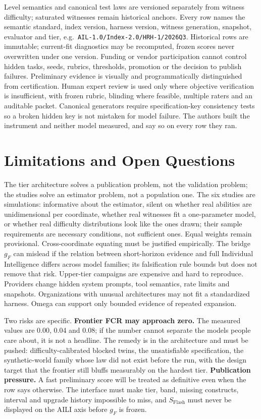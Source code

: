 \documentclass[11pt]{article}
\theoremstyle{definition}
\begin{document}
Level semantics and canonical test laws are versioned separately from witness difficulty; saturated witnesses remain historical anchors. Every row names the semantic standard, index version, harness version, witness generation, snapshot, evaluator and tier, e.g.\ \texttt{AIL-1.0/Index-2.0/HRH-1/2026Q3}. Historical rows are immutable; current-fit diagnostics may be recomputed, frozen scores never overwritten under one version. Funding or vendor participation cannot control hidden tasks, seeds, rubrics, thresholds, promotion or the decision to publish failures. Preliminary evidence is visually and programmatically distinguished from certification. Human expert review is used only where objective verification is insufficient, with frozen rubric, blinding where feasible, multiple raters and an auditable packet. Canonical generators require specification-key consistency tests so a broken hidden key is not mistaken for model failure. The authors built the instrument and neither model measured, and say so on every row they ran.

\section{Limitations and Open Questions}\label{sec:limits}

The tier architecture solves a publication problem, not the validation problem; the studies solve an estimator problem, not a population one. The six studies are simulations: informative about the estimator, silent on whether real abilities are unidimensional per coordinate, whether real witnesses fit a one-parameter model, or whether real difficulty distributions look like the ones drawn; their sample requirements are necessary conditions, not sufficient ones. Equal weights remain provisional. Cross-coordinate equating must be justified empirically. The bridge $g_F$ can mislead if the relation between short-horizon evidence and full Individual Intelligence differs across model families; its falsification rule bounds but does not remove that risk. Upper-tier campaigns are expensive and hard to reproduce. Providers change hidden system prompts, tool semantics, rate limits and snapshots. Organizations with unusual architectures may not fit a standardized harness. Omega can support only bounded evidence of repeated expansion.

Two risks are specific. \textbf{Frontier FCR may approach zero.} The measured values are 0.00, 0.04 and 0.08; if the number cannot separate the models people care about, it is not a headline. The remedy is in the architecture and must be pushed: difficulty-calibrated blocked twins, the unsatisfiable specification, the synthetic-world family whose law did not exist before the run, with the design target that the frontier still bluffs measurably on the hardest tier. \textbf{Publication pressure.} A fast preliminary score will be treated as definitive even when the row says otherwise. The interface must make tier, band, missing constructs, interval and upgrade history impossible to miss, and $S_{\mathrm{Flash}}$ must never be displayed on the AILI axis before $g_F$ is frozen.
\end{document}
